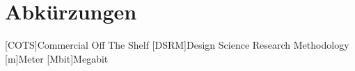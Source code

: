
\chapter*{Abkürzungen}
\begin{acronym}[PVC-U]
    [COTS]{Commercial Off The Shelf}
    [DSRM]{Design Science Research Methodology}
    [m]{Meter}
    [Mbit]{Megabit}
\end{acronym}
